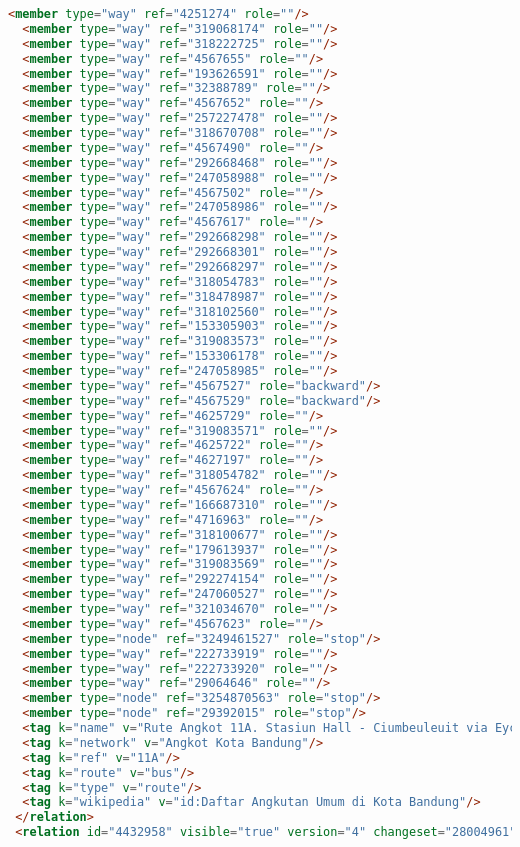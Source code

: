 \begin{lstlisting}[language=HTML,basicstyle=\tiny,caption=bandung1.xml]
  <member type="way" ref="4251274" role=""/>
  <member type="way" ref="319068174" role=""/>
  <member type="way" ref="318222725" role=""/>
  <member type="way" ref="4567655" role=""/>
  <member type="way" ref="193626591" role=""/>
  <member type="way" ref="32388789" role=""/>
  <member type="way" ref="4567652" role=""/>
  <member type="way" ref="257227478" role=""/>
  <member type="way" ref="318670708" role=""/>
  <member type="way" ref="4567490" role=""/>
  <member type="way" ref="292668468" role=""/>
  <member type="way" ref="247058988" role=""/>
  <member type="way" ref="4567502" role=""/>
  <member type="way" ref="247058986" role=""/>
  <member type="way" ref="4567617" role=""/>
  <member type="way" ref="292668298" role=""/>
  <member type="way" ref="292668301" role=""/>
  <member type="way" ref="292668297" role=""/>
  <member type="way" ref="318054783" role=""/>
  <member type="way" ref="318478987" role=""/>
  <member type="way" ref="318102560" role=""/>
  <member type="way" ref="153305903" role=""/>
  <member type="way" ref="319083573" role=""/>
  <member type="way" ref="153306178" role=""/>
  <member type="way" ref="247058985" role=""/>
  <member type="way" ref="4567527" role="backward"/>
  <member type="way" ref="4567529" role="backward"/>
  <member type="way" ref="4625729" role=""/>
  <member type="way" ref="319083571" role=""/>
  <member type="way" ref="4625722" role=""/>
  <member type="way" ref="4627197" role=""/>
  <member type="way" ref="318054782" role=""/>
  <member type="way" ref="4567624" role=""/>
  <member type="way" ref="166687310" role=""/>
  <member type="way" ref="4716963" role=""/>
  <member type="way" ref="318100677" role=""/>
  <member type="way" ref="179613937" role=""/>
  <member type="way" ref="319083569" role=""/>
  <member type="way" ref="292274154" role=""/>
  <member type="way" ref="247060527" role=""/>
  <member type="way" ref="321034670" role=""/>
  <member type="way" ref="4567623" role=""/>
  <member type="node" ref="3249461527" role="stop"/>
  <member type="way" ref="222733919" role=""/>
  <member type="way" ref="222733920" role=""/>
  <member type="way" ref="29064646" role=""/>
  <member type="node" ref="3254870563" role="stop"/>
  <member type="node" ref="29392015" role="stop"/>
  <tag k="name" v="Rute Angkot 11A. Stasiun Hall - Ciumbeuleuit via Eyckman &quot;BELOK&quot;"/>
  <tag k="network" v="Angkot Kota Bandung"/>
  <tag k="ref" v="11A"/>
  <tag k="route" v="bus"/>
  <tag k="type" v="route"/>
  <tag k="wikipedia" v="id:Daftar Angkutan Umum di Kota Bandung"/>
 </relation>
 <relation id="4432958" visible="true" version="4" changeset="28004961" timestamp="2015-01-08T20:02:59Z" user="isonpurba" uid="2552445">

\end{lstlisting}
